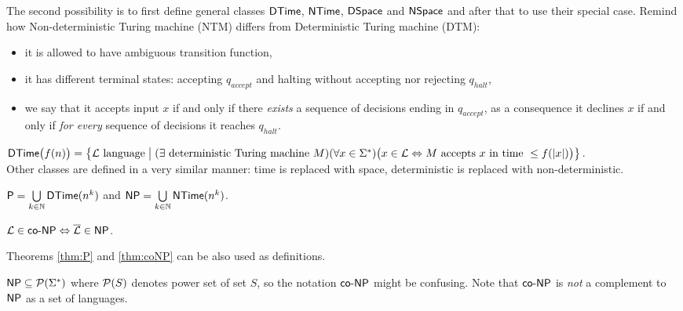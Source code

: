 		The second possibility is to first define general classes $\mathsf{DTime}$, $\mathsf{NTime}$, $\mathsf{DSpace}$ and $\mathsf{NSpace}$ and after that to use their special case. Remind how Non-deterministic Turing machine (NTM) differs from Deterministic Turing machine (DTM):
		\begin{itemize}
			\item it is allowed to have ambiguous transition function,
			\item it has different terminal states: accepting $q_{accept}$ and halting without accepting nor rejecting $q_{halt}$,
			\item we say that it accepts input $x$ if and only if there {\em exists} a sequence of decisions ending in $q_{accept}$, as a consequence it declines $x$ if and only if {\em for every} sequence of decisions it reaches $q_{halt}$.
		\end{itemize}
		
		\begin{defn}\label{def:DTime}
			$\mathsf{DTime}\bigl(f(n)\bigr) = \bigl\{ {\cal L}\textnormal{ language} \bigm| (\exists \textnormal{ deterministic Turing machine }M)\\ (\forall x\in\Sigma^*)\bigl(x\in{\cal L} \Leftrightarrow M\textnormal{ accepts }x\textnormal{ in time }\leq f(|x|)\bigr) \bigr\}$.\\
			Other classes are defined in a very similar manner: time is replaced with space, deterministic is replaced with non-deterministic.
		\end{defn}
		
		\begin{thm}
			\label{thm:P}
			$\mathsf{P} = \bigcup\limits_{k\in\mathbb{N}} \mathsf{DTime}(n^k)$ and $\mathsf{NP} = \bigcup\limits_{k\in\mathbb{N}} \mathsf{NTime}(n^k)$.
		\end{thm}
		
		\begin{thm}
			\label{thm:coNP}
			$ {\cal L} \in \mathsf{co}\textnormal{-}\mathsf{NP} \Leftrightarrow {\cal\overline L} \in \mathsf{NP} $.
		\end{thm}
		
		\begin{note}
			Theorems \ref{thm:P} and \ref{thm:coNP} can be also used as definitions.
		\end{note}
		
		\begin{note}
			$\mathsf{NP}\subseteq\mathcal{P} ( \Sigma^* )$ where $\mathcal{P} ( S )$ denotes power set of set $S$, so the notation $\mathsf{co}\textnormal{-}\mathsf{NP}$ might be confusing. Note that $\mathsf{co}\textnormal{-}\mathsf{NP}$ is {\em not} a complement to $\mathsf{NP}$ as a set of languages.
		\end{note}
		
